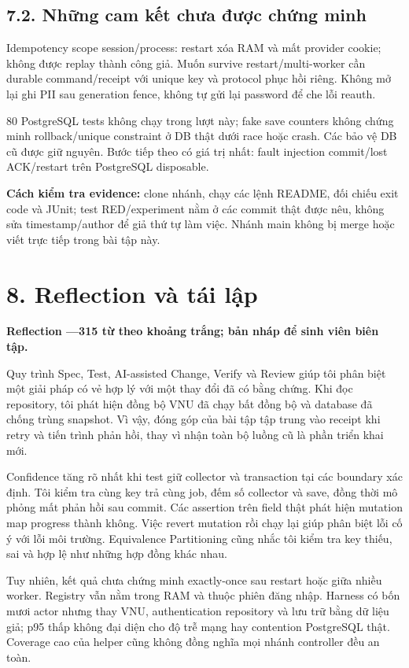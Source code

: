 \documentclass[10pt,a4paper]{article}
\begin{document}
\subsection*{7.2. Những cam kết chưa được chứng minh}
Idempotency scope session/process: restart xóa RAM và mất provider cookie; không được replay thành công giả.
Muốn survive restart/multi-worker cần durable command/receipt với unique key và protocol phục hồi riêng.
Không mở lại ghi PII sau generation fence, không tự gửi lại password để che lỗi reauth.

80 PostgreSQL tests không chạy trong lượt này; fake save counters không chứng minh rollback/unique constraint
ở DB thật dưới race hoặc crash. Các bảo vệ DB cũ được giữ nguyên. Bước tiếp theo có giá trị nhất:
fault injection commit/lost ACK/restart trên PostgreSQL disposable.

\textbf{Cách kiểm tra evidence:} clone nhánh, chạy các lệnh README, đối chiếu exit code và JUnit;
test RED/experiment nằm ở các commit thật được nêu, không sửa timestamp/author để giả thứ tự làm việc.
Nhánh main không bị merge hoặc viết trực tiếp trong bài tập này.
\clearpage

\section*{8. Reflection và tái lập}
\textbf{Reflection —315 từ theo khoảng trắng; bản nháp để sinh viên biên tập.}

Quy trình Spec, Test, AI-assisted Change, Verify và Review giúp tôi phân biệt một giải pháp có vẻ hợp lý với một thay đổi đã có bằng chứng. Khi đọc repository, tôi phát hiện đồng bộ VNU đã chạy bất đồng bộ và database đã chống trùng snapshot. Vì vậy, đóng góp của bài tập tập trung vào receipt khi retry và tiến trình phản hồi, thay vì nhận toàn bộ luồng cũ là phần triển khai mới.

Confidence tăng rõ nhất khi test giữ collector và transaction tại các boundary xác định. Tôi kiểm tra cùng key trả cùng job, đếm số collector và save, đồng thời mô phỏng mất phản hồi sau commit. Các assertion trên field thật phát hiện mutation map progress thành không. Việc revert mutation rồi chạy lại giúp phân biệt lỗi cố ý với lỗi môi trường. Equivalence Partitioning cũng nhắc tôi kiểm tra key thiếu, sai và hợp lệ như những hợp đồng khác nhau.

Tuy nhiên, kết quả chưa chứng minh exactly-once sau restart hoặc giữa nhiều worker. Registry vẫn nằm trong RAM và thuộc phiên đăng nhập. Harness có bốn mươi actor nhưng thay VNU, authentication repository và lưu trữ bằng dữ liệu giả; p95 thấp không đại diện cho độ trễ mạng hay contention PostgreSQL thật. Coverage cao của helper cũng không đồng nghĩa mọi nhánh controller đều an toàn.
\end{document}

